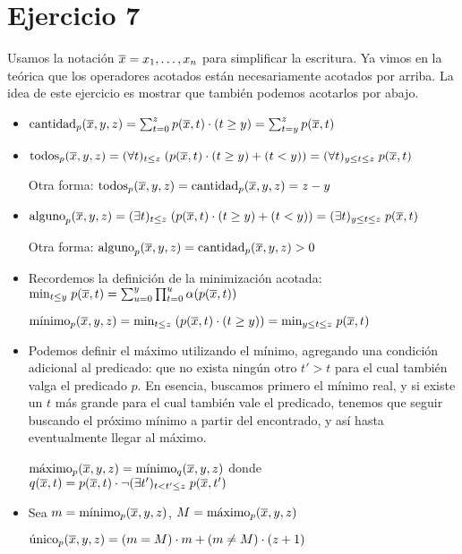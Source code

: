 \section*{Ejercicio 7}

Usamos la notación $\overline{x} = x_1, \dots, x_n$ para simplificar la escritura. Ya vimos en la teórica que los operadores acotados están necesariamente acotados por arriba. La idea de este ejercicio es mostrar que también podemos acotarlos por abajo.

\begin{itemize}
    \item $\text{cantidad}_p(\overline{x}, y, z) = \sum_{t=0}^z p(\overline{x}, t) \cdot (t \geq y) = \sum_{t=y}^z p(\overline{x}, t)$

    \item $\text{todos}_p(\overline{x}, y, z) = (\forall t)_{t \leq z} \; (p(\overline{x}, t) \cdot (t \geq y) + (t < y)) = (\forall t)_{y \leq t \leq z} \; p(\overline{x}, t)$

    Otra forma: $\text{todos}_p(\overline{x}, y, z) = \text{cantidad}_p(\overline{x}, y, z) = z - y$

    \item $\text{alguno}_p(\overline{x}, y, z) = (\exists t)_{t \leq z} \; (p(\overline{x}, t) \cdot (t \geq y) + (t < y)) = (\exists t)_{y \leq t \leq z} \; p(\overline{x}, t)$

    Otra forma: $\text{alguno}_p(\overline{x}, y, z) = \text{cantidad}_p(\overline{x}, y, z) > 0$

    \item Recordemos la definición de la minimización acotada: $\text{min}_{t \leq y} \; p(\overline{x}, t) = \sum_{u=0}^y \prod_{t=0}^u \alpha(p(\overline{x}, t))$

    $\text{mínimo}_p(\overline{x}, y, z) = \text{min}_{t \leq z} \; (p(\overline{x}, t) \cdot (t \geq y)) = \text{min}_{y \leq t \leq z} \; p(\overline{x}, t)$

    \item Podemos definir el máximo utilizando el mínimo, agregando una condición adicional al predicado: que no exista ningún otro $t' > t$ para el cual también valga el predicado $p$. En esencia, buscamos primero el mínimo real, y si existe un $t$ más grande para el cual también vale el predicado, tenemos que seguir buscando el próximo mínimo a partir del encontrado, y así hasta eventualmente llegar al máximo.

    $\text{máximo}_p(\overline{x}, y, z) = \text{mínimo}_q(\overline{x}, y, z)$ donde $q(\overline{x}, t) = p(\overline{x}, t) \cdot \neg (\exists t')_{t < t' \leq z} \; p(\overline{x}, t')$

    \item Sea $m = \text{mínimo}_p(\overline{x}, y, z)$, $M = \text{máximo}_p(\overline{x}, y, z)$

    $\text{único}_p(\overline{x}, y, z) = (m = M) \cdot m + (m \neq M) \cdot (z + 1)$
\end{itemize}

